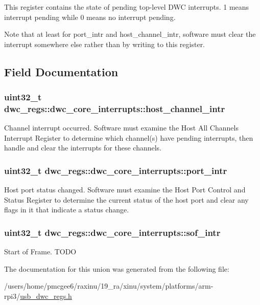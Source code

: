 This register contains the state of pending top-\/level D\-W\-C interrupts. 1 means interrupt pending while 0 means no interrupt pending.

Note that at least for port\-\_\-intr and host\-\_\-channel\-\_\-intr, software must clear the interrupt somewhere else rather than by writing to this register. 

\subsection{Field Documentation}
\hypertarget{uniondwc__regs_1_1dwc__core__interrupts_adccaa03a3106ce21f01593da1813d948}{
\subsubsection[{host\-\_\-channel\-\_\-intr}]{\setlength{\rightskip}{0pt plus 5cm}uint32\-\_\-t dwc\-\_\-regs\-::dwc\-\_\-core\-\_\-interrupts\-::host\-\_\-channel\-\_\-intr}}\label{uniondwc__regs_1_1dwc__core__interrupts_adccaa03a3106ce21f01593da1813d948}
Channel interrupt occurred. Software must examine the Host All Channels Interrupt Register to determine which channel(s) have pending interrupts, then handle and clear the interrupts for these channels. \hypertarget{uniondwc__regs_1_1dwc__core__interrupts_ae18812af64f50bab4271325ffb696393}{
\subsubsection[{port\-\_\-intr}]{\setlength{\rightskip}{0pt plus 5cm}uint32\-\_\-t dwc\-\_\-regs\-::dwc\-\_\-core\-\_\-interrupts\-::port\-\_\-intr}}\label{uniondwc__regs_1_1dwc__core__interrupts_ae18812af64f50bab4271325ffb696393}
Host port status changed. Software must examine the Host Port Control and Status Register to determine the current status of the host port and clear any flags in it that indicate a status change. \hypertarget{uniondwc__regs_1_1dwc__core__interrupts_a8d9b20aba961b10b2219b83943384c9e}{
\subsubsection[{sof\-\_\-intr}]{\setlength{\rightskip}{0pt plus 5cm}uint32\-\_\-t dwc\-\_\-regs\-::dwc\-\_\-core\-\_\-interrupts\-::sof\-\_\-intr}}\label{uniondwc__regs_1_1dwc__core__interrupts_a8d9b20aba961b10b2219b83943384c9e}
Start of Frame. T\-O\-D\-O 

The documentation for this union was generated from the following file\-:\begin{DoxyCompactItemize}
\item 
/users/home/pmcgee6/raxinu/19\-\_\-ra/xinu/system/platforms/arm-\/rpi3/\hyperlink{usb__dwc__regs_8h}{usb\-\_\-dwc\-\_\-regs.\-h}\end{DoxyCompactItemize}
